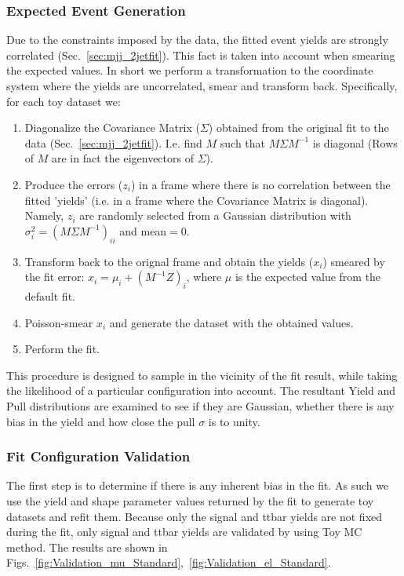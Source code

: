 \subsubsection{Expected Event Generation}
\label{sec:FitValidation_ExpectedEventGeneration}
Due to the constraints imposed by the data, the fitted event yields are strongly correlated
(Sec.~\ref{sec:mjj_2jetfit}). This fact is taken into account 
when smearing the expected values. In short we perform a transformation to 
the coordinate system where the yields are uncorrelated, smear and transform back. Specifically,
for each toy dataset we:
\begin{enumerate}
\item Diagonalize the Covariance Matrix ($\Sigma$) obtained from the original fit to the 
data (Sec.~\ref{sec:mjj_2jetfit}). I.e. find $M$ such that $M\Sigma M^{-1}$ is 
diagonal (Rows of $M$ are in fact the eigenvectors of $\Sigma$).
\item Produce the errors ($z_i$) in a frame where there is no correlation between the fitted 
'yields' (i.e. in a frame where the Covariance Matrix is diagonal). Namely, $z_i$ are randomly 
selected from a Gaussian distribution with $\sigma_i^2=(M\Sigma M^{-1})_{ii}$ and mean$=0$.
\item Transform back to the orignal frame and obtain the yields ($x_i$) smeared by the fit error: 
$x_i=\mu_i+(M^{-1}Z)_i$, where $\mu$ is the expected value from the default fit.
\item Poisson-smear $x_i$ and generate the dataset with the obtained values.
\item Perform the fit.
\end{enumerate}
This procedure is designed to sample in the vicinity of the fit result, while taking the likelihood of a particular configuration into account. The resultant Yield and Pull distributions are examined to see if they are Gaussian, whether there is any bias in the yield and how close the pull $\sigma$ is to unity.


\subsubsection{Fit Configuration Validation}
The first step is to determine if there is any inherent bias in the fit. As such we use the yield and shape parameter values returned by the fit to generate toy datasets and refit them. Because only the signal and ttbar yields are not fixed during the fit, only signal and ttbar yields are validated 
 by using Toy MC method.
The results are shown in Figs.~\ref{fig:Validation_mu_Standard},~\ref{fig:Validation_el_Standard}. %

